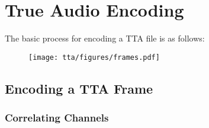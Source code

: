 
\section{True Audio Encoding}

The basic process for encoding a TTA file is as follows:
\par
\noindent
{
  
}

\begin{figure}[h]
  \texttt{[image: tta/figures/frames.pdf]}
\end{figure}

\clearpage

\subsection{Encoding a TTA Frame}
\label{tta:encode_frame}
{
  
}

\clearpage

\subsubsection{Correlating Channels}
\label{tta:correlate}



